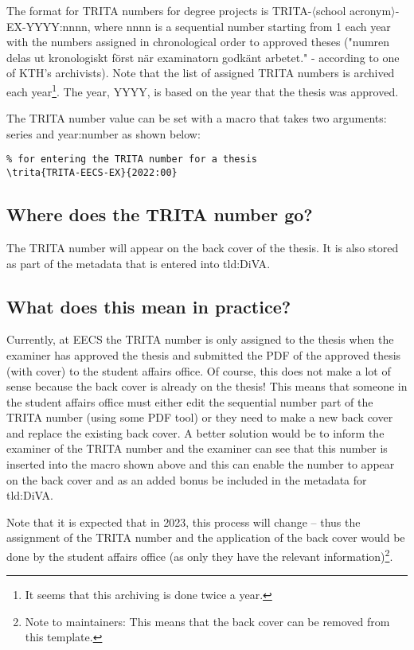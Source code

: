 The format for TRITA numbers for degree projects is TRITA-$\langle$school acronym$\rangle$-EX-YYYY:nnnn, where nnnn is a sequential number starting from 1 each year with the numbers assigned in chronological order to approved theses ("\foreignlanguage{swedish}{numren delas ut kronologiskt först när examinatorn godkänt arbetet.}" - according to one of KTH's archivists). Note that the list of assigned TRITA numbers is archived each year\footnote{It seems that this archiving is done twice a year.}. The year, YYYY, is based on the year that the thesis was approved.

The TRITA number value can be set with a macro that takes two arguments: series and year:number as shown below:
\begin{lstlisting}
% for entering the TRITA number for a thesis
\trita{TRITA-EECS-EX}{2022:00}  
\end{lstlisting}

\subsection{Where does the TRITA number go?}
The TRITA number will appear on the back cover of the thesis. It is also stored as part of the metadata that is entered into \gls{tld:DiVA}.

\subsection{What does this mean in practice?}
Currently, at EECS the TRITA number is only assigned to the thesis when the examiner has approved the thesis and submitted the PDF of the approved thesis (with cover) to the student affairs office. Of course, this does not make a lot of sense because the back cover is already on the thesis! This means that someone in the student affairs office must either \first edit the sequential number part of the TRITA number (using some PDF tool) or \Second they need to make a new back cover and replace the existing back cover. A better solution would be to inform the examiner of the TRITA number and the examiner can see that this number is inserted into the macro shown above and this can enable the number to appear on the back cover and as an added bonus be included in the metadata for \gls{tld:DiVA}.

Note that it is expected that in 2023, this process will change -- thus the assignment of the TRITA number and the application of the back cover would be done by the student affairs office (as only they have the relevant information)\footnote{Note to maintainers: This means that the back cover can be removed from this template.}.

